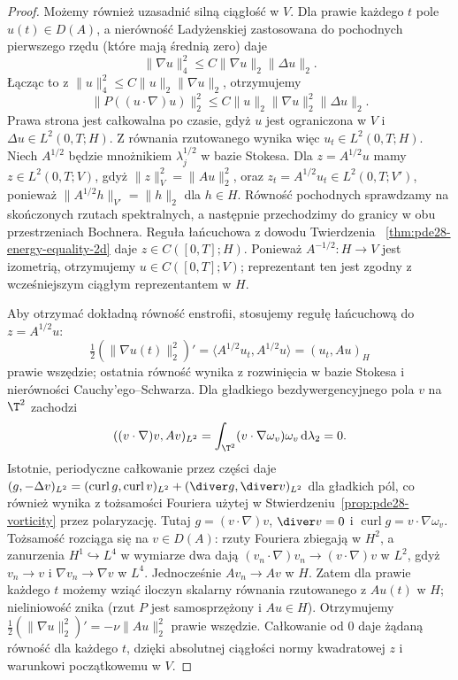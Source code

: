 \begin{proof}
Możemy również uzasadnić silną ciągłość w $V$.
Dla prawie każdego $t$ pole $u(t)\in D(A)$,
a nierówność Ladyżenskiej zastosowana do
pochodnych pierwszego rzędu (które mają średnią zero)
daje
\[
 \|\nabla u\|_4^2\le C\|\nabla u\|_2\|\Delta u\|_2.
\]
Łącząc to z $\|u\|_4^2\le C\|u\|_2\|\nabla u\|_2$,
otrzymujemy
\[
 \|P((u\cdot\nabla)u)\|_2^2
 \le C\|u\|_2\|\nabla u\|_2^2\|\Delta u\|_2.
\]
Prawa strona jest całkowalna po czasie,
gdyż $u$ jest ograniczona w $V$ i
$\Delta u\in L^2(0,T;H)$. Z równania rzutowanego
wynika więc $u_t\in L^2(0,T;H)$.
Niech $A^{1/2}$ będzie mnożnikiem
$\lambda_j^{1/2}$ w bazie Stokesa.
Dla $z=A^{1/2}u$ mamy $z\in L^2(0,T;V)$,
gdyż $\|z\|_V^2=\|Au\|_2^2$, oraz
$z_t=A^{1/2}u_t\in L^2(0,T;V')$, ponieważ
$\|A^{1/2}h\|_{V'}=\|h\|_2$ dla $h\in H$.
Równość pochodnych sprawdzamy na skończonych
rzutach spektralnych, a następnie przechodzimy
do granicy w obu przestrzeniach Bochnera.
Reguła łańcuchowa z dowodu Twierdzenia
~\ref{thm:pde28-energy-equality-2d} daje
$z\in C([0,T];H)$. Ponieważ $A^{-1/2}:H\to V$
jest izometrią, otrzymujemy $u\in C([0,T];V)$;
reprezentant ten jest zgodny z wcześniejszym
ciągłym reprezentantem w $H$.

Aby otrzymać dokładną równość enstrofii, stosujemy
regułę łańcuchową do $z=A^{1/2}u$:
\[
 \tfrac12(\|\nabla u(t)\|_2^2)'
 =\langle A^{1/2}u_t,A^{1/2}u\rangle
 =(u_t,Au)_H
\]
prawie wszędzie; ostatnia równość wynika z rozwinięcia
w bazie Stokesa i nierówności Cauchy'ego--Schwarza.
Dla gładkiego bezdywergencyjnego pola $v$ na
$\T^2$ zachodzi
\[
 ((v\cdot\nabla)v,Av)_{L^2}
 =\int_{\T^2}(v\cdot\nabla\omega_v)\omega_v\,
 \mathrm d\lambda_2=0.
\]
Istotnie, periodyczne całkowanie przez części
daje $(g,-\Delta v)_{L^2}
=(\operatorname{curl}g,\operatorname{curl}v)_{L^2}
+(\diver g,\diver v)_{L^2}$ dla gładkich pól,
co również wynika z tożsamości Fouriera użytej
w Stwierdzeniu~\ref{prop:pde28-vorticity} przez
polaryzację. Tutaj $g=(v\cdot\nabla)v$,
$\diver v=0$ i $\operatorname{curl}g=v\cdot\nabla\omega_v$.
Tożsamość rozciąga się na $v\in D(A)$:
rzuty Fouriera zbiegają w $H^2$, a zanurzenia
$H^1\hookrightarrow L^4$ w wymiarze dwa dają
$(v_n\cdot\nabla)v_n\to(v\cdot\nabla)v$ w $L^2$,
gdyż $v_n\to v$ i $\nabla v_n\to\nabla v$
w $L^4$. Jednocześnie $Av_n\to Av$ w $H$.
Zatem dla prawie każdego $t$ możemy wziąć
iloczyn skalarny równania rzutowanego z $Au(t)$
w $H$; nieliniowość znika (rzut $P$ jest
samosprzężony i $Au\in H$).
Otrzymujemy $\tfrac12(\|\nabla u\|_2^2)'
=-\nu\|Au\|_2^2$ prawie wszędzie.
Całkowanie od $0$ daje żądaną równość dla każdego
$t$, dzięki absolutnej ciągłości normy kwadratowej
$z$ i warunkowi początkowemu w $V$.
\end{proof}

